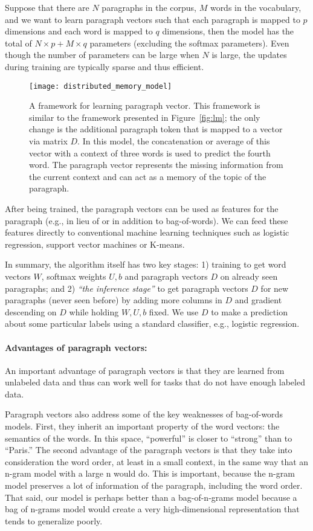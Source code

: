 \documentclass{article}
\begin{document}
Suppose that there are $N$ paragraphs in the corpus, $M$ words in the
vocabulary, and we want to learn paragraph vectors such that each
paragraph is mapped to $p$ dimensions and each word is mapped to $q$
dimensions, then the model has the total of $N \times p + M\times q$
parameters (excluding the softmax parameters). Even though the number
of parameters can be large when $N$ is large, the updates during
training are typically sparse and thus efficient.


\begin{figure}[htb]
\texttt{[image: distributed\_memory\_model]}
\caption{A framework for learning paragraph vector. This framework is
  similar to the framework presented in Figure~\ref{fig:lm}; the only
  change is the additional paragraph token that is mapped to a vector
  via matrix $D$. In this model, the concatenation or average of this
  vector with a context of three words is used to predict the fourth
  word. The paragraph vector represents the missing information from
  the current context and can act as a memory of the topic of the
  paragraph.}
\label{fig:lm2}
\end{figure}

After being trained, the paragraph vectors can be used as features for
the paragraph (e.g., in lieu of or in addition to bag-of-words). We can
feed these features directly to conventional machine learning
techniques such as logistic regression, support vector machines or
K-means.

In summary, the algorithm itself has two key stages: 1) training to
get word vectors $W$, softmax weights $U,b$ and paragraph vectors $D$
on already seen paragraphs; and 2) \emph{``the inference stage''} to
get paragraph vectors $D$ for new paragraphs (never seen before) by
adding more columns in $D$ and gradient descending on $D$ while
holding $W,U,b$ fixed. We use $D$ to make a prediction about some
particular labels using a standard classifier, e.g., logistic
regression.



\paragraph{Advantages of paragraph vectors:}
An important advantage of paragraph vectors is that they are learned
from unlabeled data and thus can work well for tasks that do not have
enough labeled data.

Paragraph vectors also address some of the key weaknesses of
bag-of-words models. First, they inherit an important property of the
word vectors: the semantics of the words. In this space, ``powerful''
is closer to ``strong'' than to ``Paris.''  The second advantage of
the paragraph vectors is that they take into consideration the word
order, at least in a small context, in the same way that an n-gram
model with a large n would do. This is important, because the n-gram
model preserves a lot of information of the paragraph, including the
word order. That said, our model is perhaps better than a
bag-of-n-grams model because a bag of n-grams model would create a
very high-dimensional representation that tends to generalize poorly.
\end{document}
